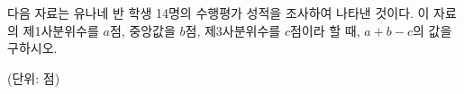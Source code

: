다음 자료는 유나네 반 학생 14명의 수행평가 성적을 조사하여 나타낸 것이다. 이 자료의 제1사분위수를 $a$점, 중앙값을 $b$점, 제3사분위수를 $c$점이라 할 때, $a+b-c$의 값을 구하시오.\par{\raggedleft\small (단위: 점)\par}
